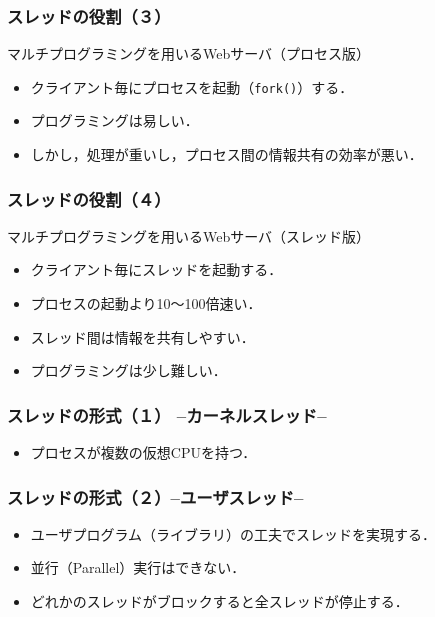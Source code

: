 \documentclass[unicode,handout]{beamer}                   %
\begin{document}
\begin{frame}
  \frametitle{スレッドの役割（３）}
  マルチプログラミングを用いるWebサーバ（プロセス版） \\
  \vfill
  \vfill
  \begin{itemize}
  \item クライアント毎にプロセスを起動（\texttt{fork()}）する．
  \item プログラミングは易しい．
  \item しかし，処理が重いし，プロセス間の情報共有の効率が悪い．
  \end{itemize}
  \vfill
\end{frame}

\begin{frame}
  \frametitle{スレッドの役割（４）}
  マルチプログラミングを用いるWebサーバ（スレッド版） \\
  \vfill
  \vfill
  \begin{itemize}
  \item クライアント毎にスレッドを起動する．
  \item プロセスの起動より10〜100倍速い．
  \item スレッド間は情報を共有しやすい．
  \item プログラミングは少し難しい．
  \end{itemize}
  \vfill
\end{frame}

\begin{frame}
  \frametitle{スレッドの形式（１） --カーネルスレッド--}
  \vfill
  \vfill
  \begin{itemize}
  \item プロセスが複数の仮想CPUを持つ．
  \end{itemize}
  \vfill
\end{frame}

\begin{frame}
  \frametitle{スレッドの形式（２）--ユーザスレッド--}
  \vfill
  \vfill
  \begin{itemize}
  \item ユーザプログラム（ライブラリ）の工夫でスレッドを実現する．
  \item 並行（Parallel）実行はできない．
  \item どれかのスレッドがブロックすると全スレッドが停止する．
  \end{itemize}
  \vfill
\end{frame}
\end{document}
